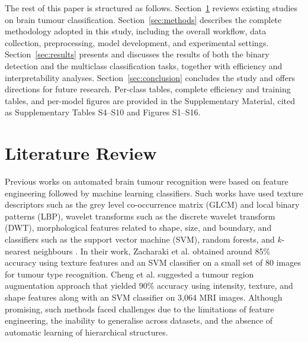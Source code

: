 \documentclass[final,3p,times,number]{elsarticle}
\begin{document}
The rest of this paper is structured as follows. Section~\ref{sec:lit} reviews existing studies on brain tumour classification. Section~\ref{sec:methods} describes the complete methodology adopted in this study, including the overall workflow, data collection, preprocessing, model development, and experimental settings. Section~\ref{sec:results} presents and discusses the results of both the binary detection and the multiclass classification tasks, together with efficiency and interpretability analyses. Section~\ref{sec:conclusion} concludes the study and offers directions for future research. Per-class tables, complete efficiency and training tables, and per-model figures are provided in the Supplementary Material, cited as Supplementary Tables S4--S10 and Figures S1--S16.

\section{Literature Review}
\label{sec:lit}

Previous works on automated brain tumour recognition were based on feature engineering followed by machine learning classifiers. Such works have used texture descriptors such as the grey level co-occurrence matrix (GLCM) and local binary patterns (LBP), wavelet transforms such as the discrete wavelet transform (DWT), morphological features related to shape, size, and boundary, and classifiers such as the support vector machine (SVM), random forests, and $k$-nearest neighbours \cite{ref2,ref3}. In their work, Zacharaki et al. \cite{ref1} obtained around 85\% accuracy using texture features and an SVM classifier on a small set of 80 images for tumour type recognition. Cheng et al. \cite{ref5} suggested a tumour region augmentation approach that yielded 90\% accuracy using intensity, texture, and shape features along with an SVM classifier on 3,064 MRI images. Although promising, such methods faced challenges due to the limitations of feature engineering, the inability to generalise across datasets, and the absence of automatic learning of hierarchical structures.
\end{document}
